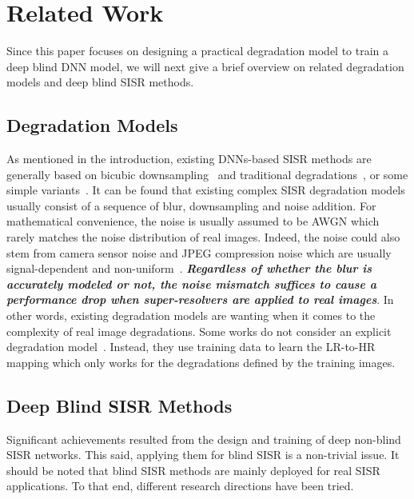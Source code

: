 \documentclass[10pt,twocolumn,letterpaper]{article}
\begin{document}
\section{Related Work}
\label{sec:related_work}
Since this paper focuses on designing a practical degradation model to train a deep blind DNN model, we will next give a brief overview on related degradation models and deep blind SISR methods.

\subsection{Degradation Models}
\label{ssc:degradation_models}

As mentioned in the introduction, existing DNNs-based SISR methods are generally based on bicubic downsampling~\cite{lai2017deep,sajjadi2017enhancenet} and traditional degradations~\cite{zhang2018image,michaeli2013nonparametric,zhang2015revisiting,zhang2019deep,liang2021flow}, or some simple variants~\cite{zhang2017learning,dong2013nonlocally,peleg2014statistical,zhang2018learning,zhang2021plug}. It can be found that existing complex SISR degradation models usually consist of a sequence of blur, downsampling and noise addition. For mathematical convenience, the noise is usually assumed to be AWGN which rarely matches the noise distribution of real images. Indeed, the noise could also stem from camera sensor noise and JPEG compression noise which are usually signal-dependent and non-uniform~\cite{plotz2017benchmarking}.
\textbf{\emph{Regardless of whether the blur is accurately modeled or not, the noise mismatch suffices to cause a performance drop when super-resolvers are applied to real images}}.
In other words, existing degradation models are wanting when it comes to the complexity of real image degradations.
Some works do not consider an explicit degradation model~\cite{yuan2018unsupervised,lugmayr2019unsupervised}. Instead, they use training data to learn the LR-to-HR mapping which only works for the degradations defined by the training images.



\subsection{Deep Blind SISR Methods}
\label{ssc:flexible_SISR}

Significant achievements resulted from the design and training of deep non-blind SISR networks. This said, applying them for blind SISR is a non-trivial issue. It should be noted that blind SISR methods are mainly deployed for real SISR applications. To that end, different research directions have been tried.
\end{document}
